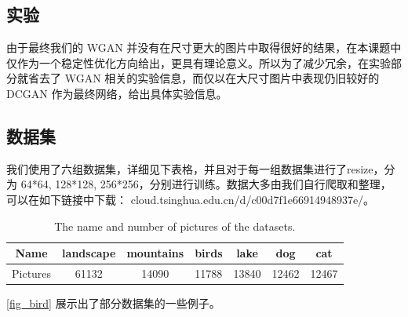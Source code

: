 \documentclass{article}
\begin{document}
\begin{CJK*}{UTF8}{gbsn}
\section{实验}

  由于最终我们的 WGAN 并没有在尺寸更大的图片中取得很好的结果，在本课题中仅作为一个稳定性优化方向给出，更具有理论意义。所以为了减少冗余，在实验部分就省去了 WGAN 相关的实验信息，而仅以在大尺寸图片中表现仍旧较好的 DCGAN 作为最终网络，给出具体实验信息。

  \subsection{数据集}
	我们使用了六组数据集，详细见下表格，并且对于每一组数据集进行了resize，分为 64*64, 128*128, 256*256，分别进行训练。数据大多由我们自行爬取和整理，可以在如下链接中下载： cloud.tsinghua.edu.cn/d/c00d7f1e66914948937e/。
	
	\begin{table}[htbp]
		\begin{center}
			\begin{tabular}{|c|c|c|c|c|c|c|}
				\hline
				Name	  & landscape	& mountains	& birds & lake  & dog   & cat \\
				\hline
				Pictures  &	61132		& 14090     & 11788 & 13840 & 12462 & 12467   \\
				\hline
			\end{tabular}
			\vspace{10pt}
			\caption{The name and number of pictures of the datasets.}
		\end{center}
	\end{table}

	\ref{fig_bird} 展示出了部分数据集的一些例子。
	

\end{CJK*}
\end{document}
